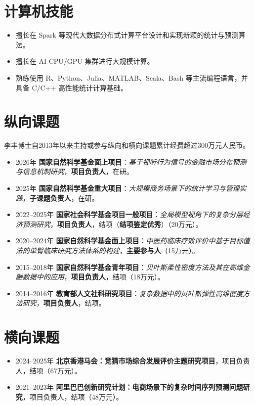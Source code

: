 \documentclass[twoside,a4paper,11pt]{article}
\begin{document}
\section{计算机技能}
\begin{itemize}

\item 擅长在 Spark 等现代大数据分布式计算平台设计和实现新颖的统计与预测算法。
\item 擅长在 AI CPU/GPU 集群进行大规模计算。
\item 熟练使用 R、Python、Julia、MATLAB、Scala、Bash 等主流编程语言，并具备 C/C++ 高性能统计计算基础。
\end{itemize}


\section{纵向课题}

李丰博士自2013年以来主持或参与纵向和横向课题累计经费超过300万元人民币。

\begin{itemize}

\item 2026年 \textbf{国家自然科学基金面上项目}：\emph{基于视听行为信号的金融市场分布预测与信息机制研究}，\textbf{项目负责人}，在研。

\item 2025年 \textbf{国家自然科学基金重大项目}：\emph{大规模商务场景下的统计学习与管理实践}，\textbf{子课题负责人}，在研。

\item 2022--2025年 \textbf{国家社会科学基金项目一般项目}：\emph{全局模型视角下的复杂分层经济预测研究}，\textbf{项目负责人}，结项（\textbf{结项鉴定优秀}）（20万元）。

\item 2020--2024年 \textbf{国家自然科学基金面上项目}：\emph{中医药临床疗效评价中基于目标值法的单臂临床研究方法体系的构建}，\textbf{主要参与人}（15万元）。

\item 2015--2018年 \textbf{国家自然科学基金青年项目}：\emph{贝叶斯柔性密度方法及其在高维金融数据中的应用}，\textbf{项目负责人}，结项（18万元）。

\item 2014--2016年 \textbf{教育部人文社科研究项目}：\emph{复杂数据中的贝叶斯弹性高维密度方法研究}，\textbf{项目负责人}，结项。

\end{itemize}

\section{横向课题}
\begin{itemize}

\item 2024--2025年 \textbf{北京香港马会：竞猜市场综合发展评价主题研究项目}，项目负责人，结项（67万元）。

\item 2021--2023年 \textbf{阿里巴巴创新研究计划：电商场景下的复杂时间序列预测问题研究}，项目负责人，结项（48万元）。

\end{itemize}
\end{document}
